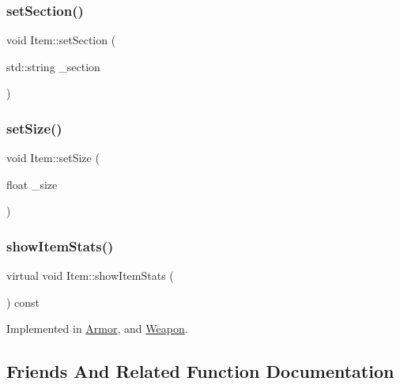 \subsubsection{\texorpdfstring{set\+Section()}{setSection()}}
{\footnotesize\ttfamily void Item\+::set\+Section (\begin{DoxyParamCaption}\item[{std\+::string}]{\+\_\+section }\end{DoxyParamCaption})}

\mbox{\label{class_item_a5ec923033eeb77f331c8307ef5141fc4}} 
\subsubsection{\texorpdfstring{set\+Size()}{setSize()}}
{\footnotesize\ttfamily void Item\+::set\+Size (\begin{DoxyParamCaption}\item[{float}]{\+\_\+size }\end{DoxyParamCaption})}

\mbox{\label{class_item_aaf7dae41afdce432c11261043e8e4e30}} 
\subsubsection{\texorpdfstring{show\+Item\+Stats()}{showItemStats()}}
{\footnotesize\ttfamily virtual void Item\+::show\+Item\+Stats (\begin{DoxyParamCaption}{ }\end{DoxyParamCaption}) const\hspace{0.3cm}{\ttfamily [pure virtual]}}



Implemented in \mbox{\hyperlink{class_armor_a4fe1507d7aaf280a18e19f51a6f8c42d}{Armor}}, and \mbox{\hyperlink{class_weapon_a5bd0118be0d84307c0865a63d907fec7}{Weapon}}.



\subsection{Friends And Related Function Documentation}
\mbox{\label{class_item_aacd78ed1db38c3d74aa80233c16b3e9c}} 
